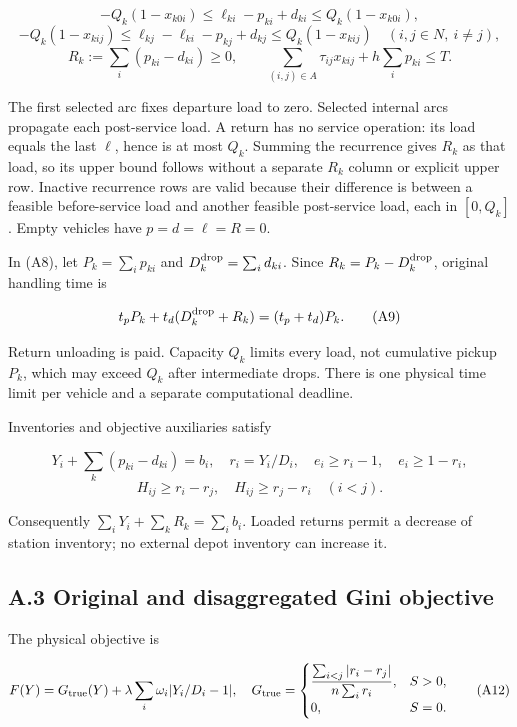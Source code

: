 \documentclass[
  american,
  11pt,
]{article}
\begin{document}
\[
-Q_k(1-x_{k0i})\le\ell_{ki}-p_{ki}+d_{ki}
\le Q_k(1-x_{k0i}),
\tag{A6}
\] \[
-Q_k(1-x_{kij})\le\ell_{kj}-\ell_{ki}-p_{kj}+d_{kj}
\le Q_k(1-x_{kij})\quad(i,j\in N,\ i\ne j),
\tag{A7}
\] \[
R_k:=\sum_i(p_{ki}-d_{ki})\ge0,\qquad
\sum_{(i,j)\in A}\tau_{ij}x_{kij}+h\sum_i p_{ki}\le T.
\tag{A8}
\]

The first selected arc fixes departure load to zero. Selected internal
arcs propagate each post-service load. A return has no service
operation: its load equals the last \(\ell\), hence is at most \(Q_k\).
Summing the recurrence gives \(R_k\) as that load, so its upper bound
follows without a separate \(R_k\) column or explicit upper row.
Inactive recurrence rows are valid because their difference is between a
feasible before-service load and another feasible post-service load,
each in \([0,Q_k]\). Empty vehicles have \(p=d=\ell=R=0\).

In (A8), let \(P_k=\sum_i p_{ki}\) and \(D_k^{\rm drop}=\sum_i d_{ki}\).
Since \(R_k=P_k-D_k^{\rm drop}\), original handling time is

\[
t_pP_k+t_d(D_k^{\rm drop}+R_k)=(t_p+t_d)P_k.
\tag{A9}
\]

Return unloading is paid. Capacity \(Q_k\) limits every load, not
cumulative pickup \(P_k\), which may exceed \(Q_k\) after intermediate
drops. There is one physical time limit per vehicle and a separate
computational deadline.

Inventories and objective auxiliaries satisfy

\[
Y_i+\sum_k(p_{ki}-d_{ki})=b_i,\quad r_i=Y_i/D_i,\quad
e_i\ge r_i-1,\quad e_i\ge1-r_i,
\tag{A10}
\] \[
H_{ij}\ge r_i-r_j,\quad H_{ij}\ge r_j-r_i\quad(i<j).
\tag{A11}
\]

Consequently \(\sum_iY_i+\sum_kR_k=\sum_i b_i\). Loaded returns permit a
decrease of station inventory; no external depot inventory can increase
it.

\subsection{A.3 Original and disaggregated Gini
objective}\label{a.3-original-and-disaggregated-gini-objective}

The physical objective is

\[
F(Y)=G_{\rm true}(Y)+\lambda\sum_i\omega_i|Y_i/D_i-1|,\quad
G_{\rm true}=\begin{cases}
\dfrac{\sum_{i<j}|r_i-r_j|}{n\sum_i r_i},&S>0,\\
0,&S=0.
\end{cases}
\tag{A12}
\]
\end{document}
